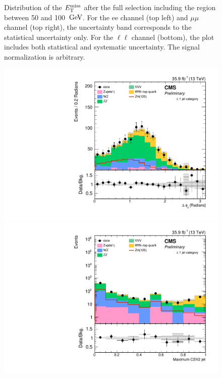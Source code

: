 \begin{figure}[hbtp]
\begin{center}
\caption{Distribution of the $E_\mathrm{T}^{\mathrm{miss}}$ after the full selection including the region between 50 and 100 $\,\text{Ge\hspace{-.08em}V}$.
  For the ee channel (top left) and $\mu\mu$ channel (top right), the uncertainty band corresponds to the statistical uncertainty only.
  For the $\ell\ell$ channel (bottom), the plot includes both statistical and systematic uncertainty.
  The signal normalization is arbitrary.}
\label{fig:distributions1}
\end{center}
\end{figure}

\begin{figure}[hbtp]
\begin{center}
\includegraphics[width=\cmsFigWidth]{figures/zh_1j_deltaphill_allcutsbutone.pdf}
\includegraphics[width=\cmsFigWidth]{figures/zh_1j_btagmax_allcutsbutone.pdf}

\end{center}
\end{figure}
